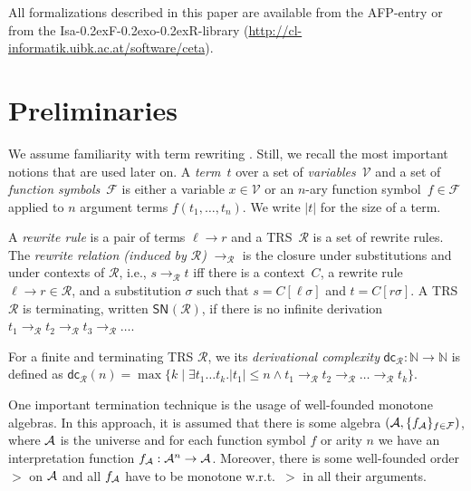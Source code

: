 \documentclass[a4paper]{llncs}
\newcommand\isafor{\textsf{Isa\kern-0.2exF\kern-0.2exo\kern-0.2exR}\xspace}
\newcommand\nats{\mathbb{N}}
\newcommand\FF{\mathcal{F}}
\newcommand\RR{\mathcal{R}}
\newcommand\VV{\mathcal{V}}
\newcommand\SN[1][]{\mathsf{SN}_{#1}}
\newcommand\rstep[1][\RR]{\to_{#1}}
\begin{document}
All formalizations described in this paper are available from the AFP-entry \cite{matrixAFP} or from the
\isafor-library (\url{http://cl-informatik.uibk.ac.at/software/ceta}).


\section{Preliminaries}
\label{basics}

We assume  familiarity with term rewriting \cite{BN98}. Still, we
recall the most important notions that are used later on. A 
\emph{term}~$t$ over a set of \emph{variables}~$\VV$ and a set of
\emph{function symbols}~$\FF$ is
either a variable $x \in \VV$ or an \mbox{$n$-ary} function symbol~$f \in \FF$ applied to
$n$ argument terms $f(t_1, \ldots, t_n)$. We write $|t|$ for the size of a term.

A \emph{rewrite rule} is a pair of terms
$\ell \to r$ and a TRS~$\RR$ is a set of rewrite rules.
The \emph{rewrite relation (induced by $\RR$)} $\rstep$ is the closure
under substitutions and under contexts of $\RR$, i.e., $s \rstep t$ iff
there is a context~$C$, a rewrite rule $\ell\to r \in \RR$, and a substitution
$\sigma$ such that
$s = C[\ell\sigma]$ and $t = C[r\sigma]$. 
A TRS~$\RR$ is terminating, written $\SN(\RR)$, if there is no
infinite derivation $t_1 \to_\RR t_2 \to_\RR t_3 \to_\RR \dots$.

\newcommand{\dc}{\mathsf{dc}_\RR}
\newcommand{\tor}{\to_\RR}

For a finite and terminating TRS $\RR$, we its \emph{derivational 
complexity} $\dc : \nats \to \nats$ is defined as $\dc(n) = \max \{k \mid \exists t_1 \dots t_k. |t_1| \leq n \wedge t_1 \tor t_2 \tor \dots \tor t_k \}$.

\newcommand{\pl}{\oplus}
\newcommand{\ti}{\odot}
\newcommand{\one}{\underline{\mathsf{1}}}
\newcommand{\zero}{\underline{\mathsf{0}}}
\newcommand{\mono}{\mathsf{mono}}
\newcommand{\pos}{\mathsf{pos}}
\renewcommand{\max}{\mathsf{max}}
\newcommand{\mat}[1]{#1^{n \times n}}
\newcommand{\matsd}[1]{#1_{sd}^{n \times n}}
\newcommand{\A}{{\cal A}}
\newcommand{\sema}[1]{[\![#1]\!]_\alpha}
\newcommand{\semo}[1]{[\![#1]\!]}
\newcommand{\MM}{{\cal M}}
\newcommand{\OO}{{\cal O}}
\newcommand{\norm}[1]{||#1||}

One important termination technique is the usage of
well-founded monotone algebras. In this approach, it is
assumed that there is some algebra $(\A,\{f_\A\}_{f \in \FF})$,
where $\A$ is the universe and for each function symbol 
$f$ or arity $n$ we have an interpretation 
function $f_\A : \A^n \to \A$. Moreover, there is some well-founded order
$>$ on $\A$ and all $f_\A$ have to be monotone w.r.t.~$>$ in all their arguments.
\end{document}

